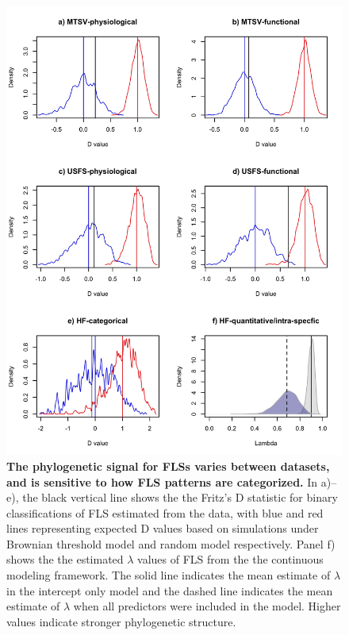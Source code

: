 \documentclass[11pt]{article}
\begin{document}
\begin{figure}[H]
\centering
\includegraphics[height=0.8\textheight]{..//..//phylosig.jpeg} 
\caption{\textbf{The phylogenetic signal for FLSs varies between datasets, and is sensitive to how FLS patterns are categorized.} In a)--e), the black vertical line shows the the Fritz's D statistic for binary classifications of FLS estimated from the data, with blue and red lines representing expected D values based on simulations under Brownian threshold model and random model respectively. Panel f) shows the the estimated $\lambda$ values of FLS from the the continuous modeling framework. The solid line indicates the mean estimate of $\lambda$ in the intercept only model and the dashed line indicates the mean estimate of $\lambda$ when all predictors were included in the model. Higher values indicate stronger phylogenetic structure.}
\label{fig:Dstat}
\end{figure}
\end{document}
